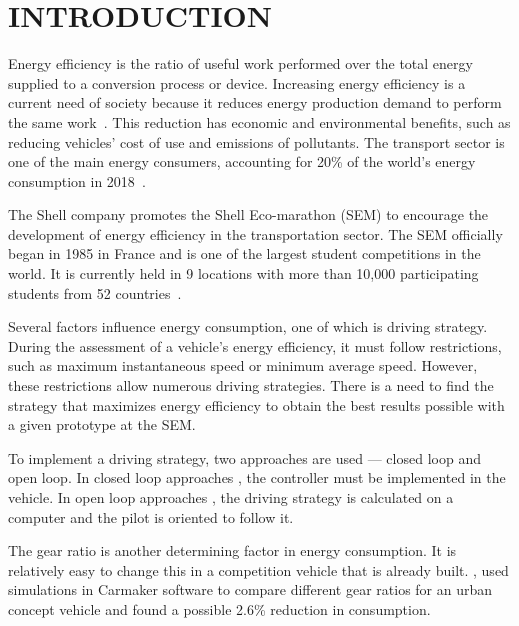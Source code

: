 \section{INTRODUCTION}

Energy efficiency is the ratio of useful work performed over the total energy supplied to a conversion process or device. 
Increasing energy efficiency is a current need of society because it reduces energy production demand to perform the same work~\citep{report:iea_efficiency}. 
This reduction has economic and environmental benefits, such as reducing vehicles’ cost of use and emissions of pollutants. 
The transport sector is one of the main energy consumers, accounting for 20\% of the world’s energy consumption in 2018~\citep{report:iea_data}.

The Shell company promotes the Shell Eco-marathon (SEM) to encourage the development of energy efficiency in the transportation sector. 
The SEM officially began in 1985 in France and is one of the largest student competitions in the world. 
It is currently held in 9 locations with more than 10,000 participating students from 52 countries~\citep{site:shell}.


Several factors influence energy consumption, one of which is driving strategy. 
During the assessment of a vehicle’s energy efficiency, it must follow restrictions, such as maximum instantaneous speed or minimum average speed. 
However, these restrictions allow numerous driving strategies. 
There is a need to find the strategy that maximizes energy efficiency to obtain the best results possible with a given prototype at the SEM.

To implement a driving strategy, two approaches are used --- closed loop and open loop. 
In closed loop approaches \citep{pp:Liu2018, pp:Sawulski2019, pp:Briguiet2020}, the controller must be implemented in the vehicle. 
In open loop approaches \citep{pp:Guzzella2007, pp:Targosz2018, pp:Gechev2020}, the driving strategy is calculated on a computer and the pilot is oriented to follow it. 

The gear ratio is another determining factor in energy consumption. 
It is relatively easy to change this in a competition vehicle that is already built. 
\citet{pp:Spanoudakis2020}, used simulations in Carmaker software to compare different gear ratios for an urban concept vehicle and found a possible 2.6\% reduction in consumption.

